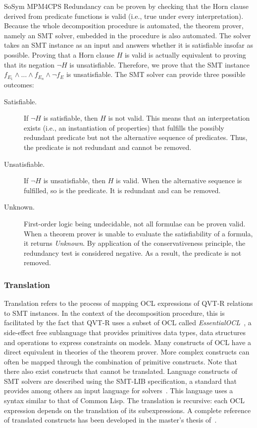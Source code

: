 \begin{copiedFrom}{SoSym MPM4CPS}
Redundancy can be proven by checking that the Horn clause derived from predicate functions is valid (i.e., true under every interpretation). Because the whole decomposition procedure is automated, the theorem prover, namely an SMT solver, embedded in the procedure is also automated. 
The solver takes an SMT instance as an input and answers whether it is satisfiable insofar as possible.
Proving that a Horn clause $H$ is valid is actually equivalent to proving that its negation $\neg H$ is unsatisfiable. Therefore, we prove that the SMT instance $f_{E_1} \wedge \dots \wedge f_{E_n} \wedge \neg f_{E}$ is unsatisfiable. The SMT solver can provide three possible outcomes:

\begin{description}
    \item[Satisfiable.] If $\neg H$ is satisfiable, then $H$ is not valid. This means that an interpretation exists (i.e., an instantiation of properties) that fulfills the possibly redundant predicate but not the alternative sequence of predicates. Thus, the predicate is not redundant and cannot be removed.
    \item[Unsatisfiable.] If $\neg H$ is unsatisfiable, then $H$ is valid. When the alternative sequence is fulfilled, so is the predicate. It is redundant and can be removed.
    \item[Unknown.] First-order logic being undecidable, not all formulae can be proven valid. When a theorem prover is unable to evaluate the satisfiability of a formula, it returns \textit{Unknown}. By application of the conservativeness principle, the redundancy test is considered negative. As a result, the predicate is not removed.
\end{description}

\subsubsection{Translation}

Translation refers to the process of mapping OCL expressions of QVT-R relations to SMT instances. In the context of the decomposition procedure, this is facilitated by the fact that QVT-R uses a subset of OCL called \textit{EssentialOCL}~\cite{qvt}, a side-effect free sublanguage that provides primitives data types, data structures and operations to express constraints on models. Many constructs of OCL have a direct equivalent in theories of the theorem prover. More complex constructs can often be mapped through the combination of primitive constructs. Note that there also exist constructs that cannot be translated. Language constructs of SMT solvers are described using the SMT-LIB specification, a standard that provides among others an input language for solvers~\cite{smtlib2017}. This language uses a syntax similar to that of Common Lisp. The translation is recursive: each OCL expression depends on the translation of its subexpressions. A complete reference of translated constructs has been developed in the master's thesis of~\textcite{pepin2019ma}.


\end{copiedFrom}
